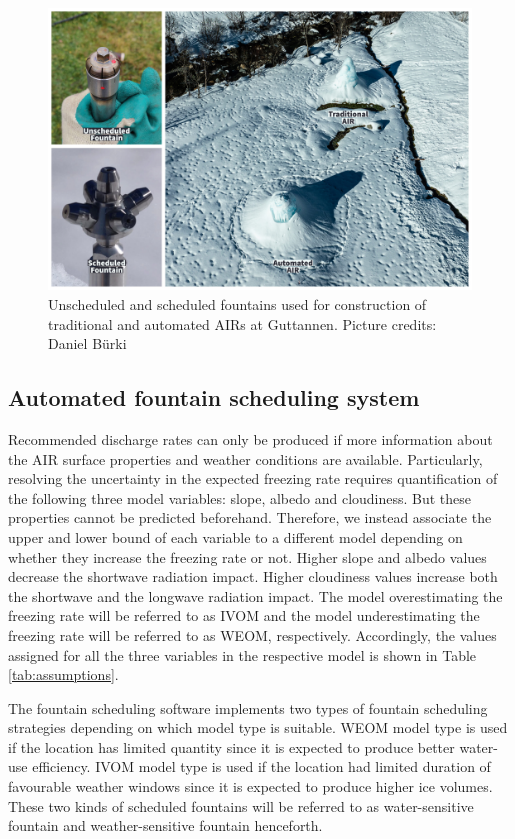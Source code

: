 \begin{figure}[htb]
\includegraphics[width=\textwidth]{figs/AIR_fountains.jpg}
\caption{Unscheduled and scheduled fountains used for construction of traditional and automated AIRs at Guttannen. Picture credits: Daniel Bürki}
\label{fig:autovsman}
\end{figure}

\subsection{Automated fountain scheduling system}


Recommended discharge rates can only be produced if more information about the AIR surface properties and
weather conditions are available. Particularly, resolving the uncertainty in the expected freezing rate requires
quantification of the following three model variables: slope, albedo and cloudiness. But these properties cannot
be predicted beforehand. Therefore, we instead associate the upper and lower bound of each variable to a
different model depending on whether they increase the freezing rate or not. Higher slope and albedo values
decrease the shortwave radiation impact. Higher cloudiness values increase both the shortwave and the longwave
radiation impact. The model overestimating the freezing rate will be referred to as \ac{IVOM} and the model
underestimating the freezing rate will be referred to as  \ac{WEOM}, respectively. Accordingly, the values
assigned for all the three variables in the respective model is shown in Table \ref{tab:assumptions}.

The fountain scheduling software implements two types of fountain scheduling strategies depending on which
model type is suitable. WEOM model type is used if the location has limited quantity since it is expected to
produce better water-use efficiency. \ac{IVOM} model type is used if the location had limited duration of favourable
weather windows since it is expected to produce higher ice volumes. These two kinds of scheduled fountains will
be referred to as water-sensitive fountain and weather-sensitive fountain henceforth.

